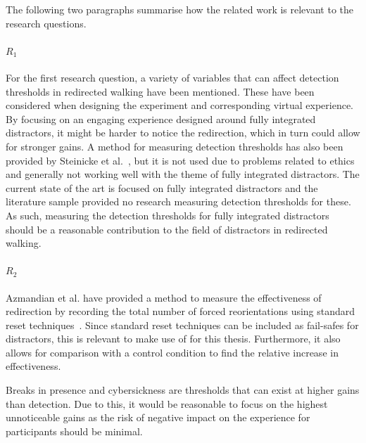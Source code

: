 The following two paragraphs summarise how the related work is relevant to the research questions.

\paragraph{$R_1$}
For the first research question, a variety of variables that can affect detection thresholds in redirected walking have been mentioned. These have been considered when designing the experiment and corresponding virtual experience. By focusing on an engaging experience designed around fully integrated distractors, it might be harder to notice the redirection, which in turn could allow for stronger gains. A method for measuring detection thresholds has also been provided by Steinicke et al.~\cite{5072212}, but it is not used due to problems related to ethics and generally not working well with the theme of fully integrated distractors. The current state of the art is focused on fully integrated distractors and the literature sample provided no research measuring detection thresholds for these. As such, measuring the detection thresholds for fully integrated distractors should be a reasonable contribution to the field of distractors in redirected walking.

\paragraph{$R_2$}
Azmandian et al. have provided a method to measure the effectiveness of redirection by recording the total number of forced reorientations using standard reset techniques~\cite{azmandian2015physical}. Since standard reset techniques can be included as fail-safes for distractors, this is relevant to make use of for this thesis. Furthermore, it also allows for comparison with a control condition to find the relative increase in effectiveness.

Breaks in presence and cybersickness are thresholds that can exist at higher gains than detection. Due to this, it would be reasonable to focus on the highest unnoticeable gains as the risk of negative impact on the experience for participants should be minimal. 

